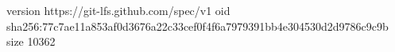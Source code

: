 version https://git-lfs.github.com/spec/v1
oid sha256:77c7ae11a853af0d3676a22c33cef0f4f6a7979391bb4e304530d2d9786c9c9b
size 10362
